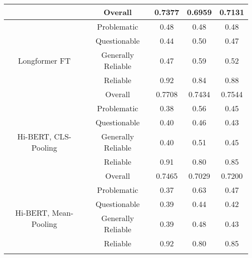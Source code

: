\begin{table}[htbp]
\begin{longtable}{| c | c | c | c | c |}
                                                          & Overall            & 0.7377             & 0.6959          & 0.7131          \\
        \hline
        \multirow{5}{*}{Longformer FT}                    & Problematic        & 0.48               & 0.48            & 0.48            \\
                                                          & Questionable       & 0.44               & 0.50            & 0.47            \\
                                                          & Generally Reliable & 0.47               & 0.59            & 0.52            \\
                                                          & Reliable           & 0.92               & 0.84            & 0.88            \\\cline{2-5}
                                                          & Overall            & 0.7708             & 0.7434          & 0.7544          \\
        \hline
        \multirow{5}{*}{Hi-BERT, CLS-Pooling}             & Problematic        & 0.38               & 0.56            & 0.45            \\
                                                          & Questionable       & 0.40               & 0.46            & 0.43            \\
                                                          & Generally Reliable & 0.40               & 0.51            & 0.45            \\
                                                          & Reliable           & 0.91               & 0.80            & 0.85            \\\cline{2-5}
                                                          & Overall            & 0.7465             & 0.7029          & 0.7200          \\
        \hline
        \multirow{5}{*}{Hi-BERT, Mean-Pooling}            & Problematic        & 0.37               & 0.63            & 0.47            \\
                                                          & Questionable       & 0.39               & 0.44            & 0.42            \\
                                                          & Generally Reliable & 0.39               & 0.48            & 0.43            \\
                                                          & Reliable           & 0.92               & 0.80            & 0.85            \\\cline{2-5}

\end{longtable}
\end{table}

